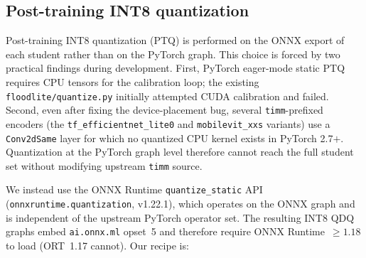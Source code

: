 \subsection{Post-training INT8 quantization}
\label{sec:methods-ptq}

Post-training INT8 quantization (PTQ) is performed on the ONNX export of each student rather than on the PyTorch graph. This choice is forced by two practical findings during development. First, PyTorch eager-mode static PTQ requires CPU tensors for the calibration loop; the existing \texttt{floodlite/quantize.py} initially attempted CUDA calibration and failed. Second, even after fixing the device-placement bug, several \texttt{timm}-\allowbreak prefixed encoders (the \texttt{tf\_\allowbreak efficientnet\_\allowbreak lite0} and \texttt{mobilevit\_xxs} variants) use a \texttt{Conv2dSame} layer for which no quantized CPU kernel exists in PyTorch 2.7$+$. Quantization at the PyTorch graph level therefore cannot reach the full student set without modifying upstream \texttt{timm} source.

We instead use the ONNX Runtime \texttt{quantize\_static} API~\cite{ortQuant} (\texttt{onnxruntime.quantization}, v1.22.1), which operates on the ONNX graph and is independent of the upstream PyTorch operator set. The resulting INT8 QDQ graphs embed \texttt{ai.onnx.ml} opset~5 and therefore require ONNX Runtime~$\geq 1.18$ to load (ORT~1.17 cannot). Our recipe is:

